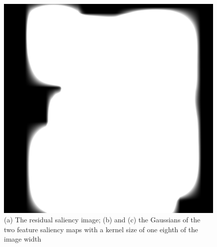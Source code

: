 \begin{figure}
\begin{minipage}{.33\textwidth}
	\end{minipage}~
	\begin{minipage}{.33\textwidth}
		\includegraphics[width=1\linewidth]{images/engine_naive_gaussian_2}
	\end{minipage}
	\caption{(a) The residual saliency image; (b) and (c) the Gaussians of the two feature saliency maps with a kernel size of one eighth of the image width}
	\label{fig:engine_naive_saliencemap_left}
\end{figure}

